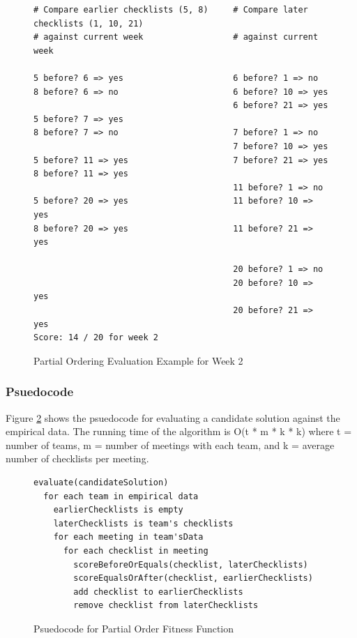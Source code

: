 \documentclass[preprint,12pt,3p]{elsarticle}
\begin{document}
\begin{figure}[!htb]
\begin{verbatim}
# Compare earlier checklists (5, 8)     # Compare later checklists (1, 10, 21)
# against current week                  # against current week

5 before? 6 => yes                      6 before? 1 => no
8 before? 6 => no                       6 before? 10 => yes
                                        6 before? 21 => yes
5 before? 7 => yes                  
8 before? 7 => no                       7 before? 1 => no
                                        7 before? 10 => yes
5 before? 11 => yes                     7 before? 21 => yes
8 before? 11 => yes                     
                                        11 before? 1 => no 
5 before? 20 => yes                     11 before? 10 => yes
8 before? 20 => yes                     11 before? 21 => yes
                                        
                                        20 before? 1 => no
                                        20 before? 10 => yes
                                        20 before? 21 => yes
Score: 14 / 20 for week 2
\end{verbatim}
 \caption{Partial Ordering Evaluation Example for Week 2}
 \label{evaluation_example}
\end{figure}

\subsubsection{Psuedocode}
Figure \ref{psuedocode} shows the psuedocode for evaluating a candidate solution against the empirical data. The running time of the algorithm is O(t * m * k * k) where
t = number of teams,
m = number of meetings with each team, and
k = average number of checklists per meeting.

\begin{figure}[ht]
\begin{verbatim}
evaluate(candidateSolution)
  for each team in empirical data
    earlierChecklists is empty
    laterChecklists is team's checklists
    for each meeting in team'sData
      for each checklist in meeting
        scoreBeforeOrEquals(checklist, laterChecklists)
        scoreEqualsOrAfter(checklist, earlierChecklists)
        add checklist to earlierChecklists 
        remove checklist from laterChecklists
\end{verbatim}
 \caption{Psuedocode for Partial Order Fitness Function}
 \label{psuedocode}
\end{figure}
\end{document}

